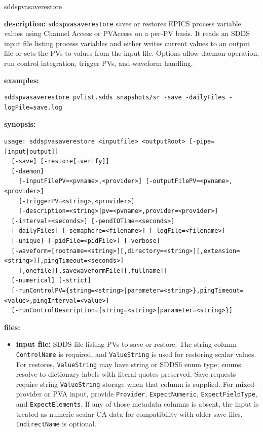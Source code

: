 \begin{sddsprog}{sddspvasaverestore}
\item \textbf{description:}
  \verb+sddspvasaverestore+ saves or restores EPICS process variable values using
  Channel Access or PVAccess on a per-PV basis. It reads an SDDS input file listing process variables and either writes current
  values to an output file or sets the PVs to values from the input file. Options allow daemon
  operation, run control integration, trigger PVs, and waveform handling.
\item \textbf{examples:}
\begin{verbatim}
sddspvasaverestore pvlist.sdds snapshots/sr -save -dailyFiles -logFile=save.log
\end{verbatim}
\item \textbf{synopsis:}
\begin{verbatim}
usage: sddspvasaverestore <inputfile> <outputRoot> [-pipe=[input|output]]
  [-save] [-restore[=verify]]
  [-daemon]
    [-inputFilePV=<pvname>,<provider>] [-outputFilePV=<pvname>,<provider>]
    [-triggerPV=<string>,<provider>]
    [-description=<string>|pv=<pvname>,provider=<provider>]
  [-interval=<seconds>] [-pendIOTime=<seconds>]
  [-dailyFiles] [-semaphore=<filename>] [-logFile=<filename>]
  [-unique] [-pidFile=<pidFile>] [-verbose]
  [-waveform=[rootname=<string>][,directory=<string>][,extension=<string>][,pingTimeout=<seconds>]
    [,onefile][,savewaveformFile][,fullname]]
  [-numerical] [-strict]
  [-runControlPV={string=<string>|parameter=<string>},pingTimeout=<value>,pingInterval=<value>]
  [-runControlDescription={string=<string>|parameter=<string>}]
\end{verbatim}
\item \textbf{files:}
\begin{itemize}
  \item \textbf{input file:} SDDS file listing PVs to save or restore. The
    string column \verb|ControlName| is required, and \verb|ValueString| is
    used for restoring scalar values. For restores, \verb|ValueString| may have
    string or SDDS6 enum type; enums resolve to dictionary labels with literal
    quotes preserved. Save requests require string \verb|ValueString| storage
    when that column is supplied. For mixed-provider or PVA input, provide
    \verb|Provider|, \verb|ExpectNumeric|, \verb|ExpectFieldType|, and
    \verb|ExpectElements|. If any of those metadata columns is absent, the
    input is treated as numeric scalar CA data for compatibility with older
    save files. \verb|IndirectName| is optional.

\end{itemize}
\end{sddsprog}
